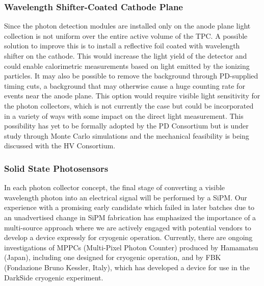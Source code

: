 \subsubsection{Wavelength Shifter-Coated Cathode Plane} 
Since the photon detection modules are installed only on the anode plane light collection is not uniform over the entire active volume of the TPC. A possible solution to improve this is to install a reflective foil coated with wavelength shifter on the cathode.
This would increase the light yield of the detector and could enable calorimetric measurements based on light emitted by the ionizing particles. It may also be possible to remove the  background through PD-supplied timing cuts, a background that may otherwise cause a huge counting rate for events near the anode plane. This option would require visible light sensitivity for the photon collectors, which is not currently the case but could be incorporated in a variety of ways with some impact on the direct light measurement. This possibility has yet to be formally adopted by the PD Consortium but is under study through Monte Carlo simulations and the mechanical feasibility is being discussed with the HV Consortium.


\subsubsection{Solid State Photosensors} 
In each photon collector concept, the final stage of converting a visible wavelength photon into an electrical signal will be performed by a SiPM. Our experience with a promising early candidate which failed in later batches due to an unadvertised change in SiPM fabrication has emphasized the importance of a multi-source approach where we are actively engaged with potential vendors to develop a device expressly for cryogenic operation. Currently, there are ongoing investigations of MPPCs (Multi-Pixel Photon Counter) produced by Hamamatsu (Japan), including one designed for cryogenic operation, and by FBK (Fondazione Bruno Kessler, Italy), which has developed a device for use in the DarkSide cryogenic experiment.

